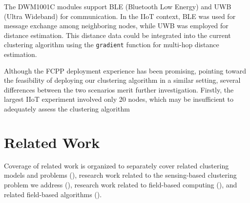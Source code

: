 The DWM1001C modules support BLE (Bluetooth Low Energy) and UWB (Ultra Wideband) for communication. 
 In the IIoT context, BLE was used for message exchange among neighboring nodes, while UWB was employed for distance estimation. 
 This distance data could be integrated into the current clustering algorithm using the \lstinline|gradient| function for multi-hop distance estimation.

Although the FCPP deployment experience has been promising, pointing toward the feasibility of deploying our clustering algorithm in a similar setting, 
 several differences between the two scenarios merit further investigation. 
 Firstly, the largest IIoT experiment involved only 20 nodes, 
 which may be insufficient to adequately assess the clustering algorithm
\section{Related Work}
\label{s:rw}
%
Coverage of related work is organized to separately cover
 related clustering models and problems (),
 research work related to the sensing-based clustering problem we address (),
 research work related to field-based computing (),
 and related field-based algorithms ().

